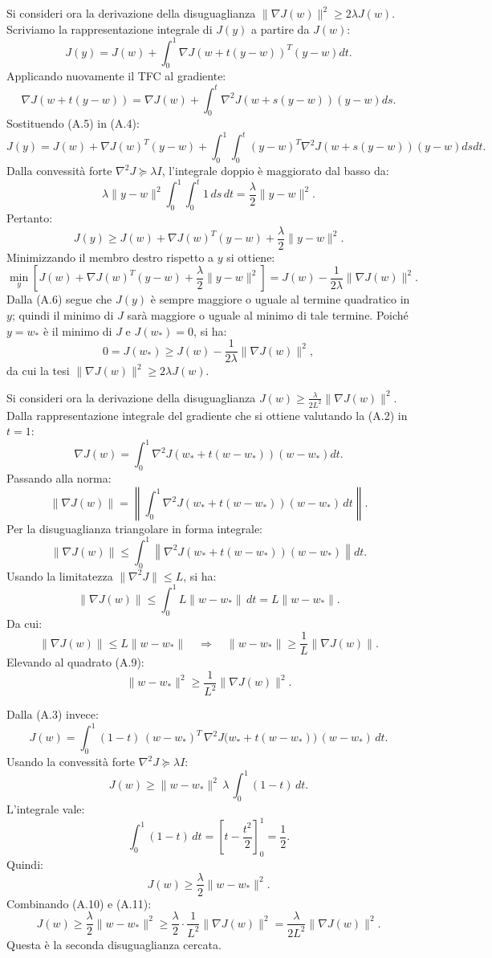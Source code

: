 \documentclass[italian, a4paper, twoside, binding=6mm]{sapthesis}
\begin{document}
Si consideri ora la derivazione della disuguaglianza $\|\nabla J(w)\|^2 \geq 2\lambda J(w)$. Scriviamo la rappresentazione integrale di $J(y)$ a partire da $J(w)$:
\[
J(y) = J(w) + \int_0^1 \nabla J(w + t(y - w))^T (y - w) dt. \tag{A.4}
\]
Applicando nuovamente il TFC al gradiente:
\[
\nabla J(w + t(y - w)) = \nabla J(w) + \int_0^t \nabla^2 J(w + s(y - w))(y - w) ds. \tag{A.5}
\]
Sostituendo (A.5) in (A.4):
\[
J(y) = J(w) + \nabla J(w)^T(y - w) + \int_0^1 \int_0^t (y - w)^T \nabla^2 J(w + s(y - w))(y - w) ds dt.
\]
Dalla convessità forte $\nabla^2 J \succeq \lambda I$, l'integrale doppio è maggiorato dal basso da:
\[
\lambda \|y - w\|^2 \int_0^1 \int_0^t 1 \, ds \, dt = \frac{\lambda}{2}\|y - w\|^2.
\]
Pertanto:
\[
J(y) \geq J(w) + \nabla J(w)^T(y - w) + \frac{\lambda}{2}\|y - w\|^2. \tag{A.6}
\]
Minimizzando il membro destro rispetto a $y$ si ottiene:
\[
\min_y \left[ J(w) + \nabla J(w)^T(y - w) + \frac{\lambda}{2}\|y - w\|^2 \right]
= J(w) - \frac{1}{2\lambda}\|\nabla J(w)\|^2.
\]
Dalla (A.6) segue che $J(y)$ è sempre maggiore o uguale al termine quadratico in $y$; quindi il minimo di $J$ sarà maggiore o uguale al minimo di tale termine. Poiché $y = w_*$ è il minimo di $J$ e $J(w_*) = 0$, si ha:
\[
0 = J(w_*) \geq J(w) - \frac{1}{2\lambda}\|\nabla J(w)\|^2,
\]
da cui la tesi $\|\nabla J(w)\|^2 \geq 2\lambda J(w)$.

Si consideri ora la derivazione della disuguaglianza $J(w) \geq \frac{\lambda}{2L^2} \|\nabla J(w)\|^2$. Dalla rappresentazione integrale del gradiente che si ottiene valutando la (A.2) in $t=1$:
\[
\nabla J(w) = \int_0^1 \nabla^2 J(w_* + t(w - w_*))(w - w_*) dt. \tag{A.7}
\]
Passando alla norma:
\[
\|\nabla J(w)\| 
= \left\| \int_0^1 \nabla^2 J(w_* + t(w - w_*))(w - w_*) \, dt \right\|.
\]
Per la disuguaglianza triangolare in forma integrale:
\[
\|\nabla J(w)\| 
\leq \int_0^1 \left\| \nabla^2 J(w_* + t(w - w_*))(w - w_*) \right\| dt.
\]
Usando la limitatezza $\|\nabla^2 J\| \leq L$, si ha:
\[
\|\nabla J(w)\| 
\leq \int_0^1 L \|w - w_*\| \, dt 
= L \|w - w_*\|. \tag{A.8}
\]
Da cui:
\[
\|\nabla J(w)\| \leq L \|w - w_*\| \quad \Longrightarrow \quad \|w - w_*\| \geq \frac{1}{L} \|\nabla J(w)\|. \tag{A.9}
\]
Elevando al quadrato (A.9):
\[
\|w - w_*\|^2 \geq \frac{1}{L^2} \|\nabla J(w)\|^2. \tag{A.10}
\]

Dalla (A.3) invece:
\[
J(w) = \int_0^1 (1-t) \, (w - w_*)^T \, \nabla^2 J\bigl(w_* + t(w - w_*)\bigr) \, (w - w_*) \, dt.
\]
Usando la convessità forte $\nabla^2 J \succeq \lambda I$:
\[
J(w) \ge \|w - w_*\|^2 \, \lambda \, \int_0^1 (1-t) \, dt.
\]
L'integrale vale:
\[
\int_0^1 (1-t) \, dt = \left[t - \frac{t^2}{2}\right]_0^1 = \frac{1}{2}.
\]
Quindi:
\[
J(w) \geq \frac{\lambda}{2} \|w - w_*\|^2. \tag{A.11}
\]
Combinando (A.10) e (A.11):
\[
J(w) \geq \frac{\lambda}{2} \|w - w_*\|^2 \geq \frac{\lambda}{2} \cdot \frac{1}{L^2} \|\nabla J(w)\|^2 = \frac{\lambda}{2L^2} \|\nabla J(w)\|^2.
\]
Questa è la seconda disuguaglianza cercata.
\end{document}
